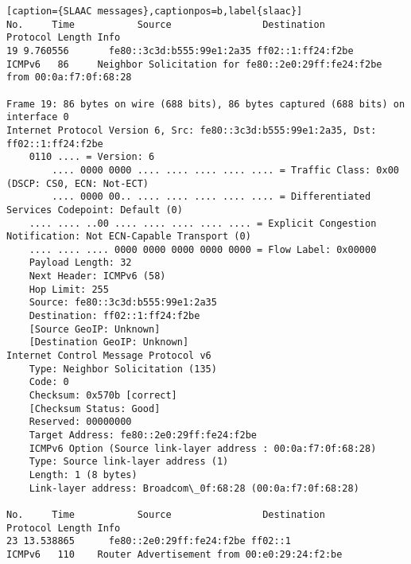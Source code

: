 \begin{lstlisting}[caption={SLAAC messages},captionpos=b,label{slaac}]
No.     Time           Source                Destination           Protocol Length Info
19 9.760556       fe80::3c3d:b555:99e1:2a35 ff02::1:ff24:f2be     ICMPv6   86     Neighbor Solicitation for fe80::2e0:29ff:fe24:f2be from 00:0a:f7:0f:68:28

Frame 19: 86 bytes on wire (688 bits), 86 bytes captured (688 bits) on interface 0
Internet Protocol Version 6, Src: fe80::3c3d:b555:99e1:2a35, Dst: ff02::1:ff24:f2be
	0110 .... = Version: 6
		.... 0000 0000 .... .... .... .... .... = Traffic Class: 0x00 (DSCP: CS0, ECN: Not-ECT)
		.... 0000 00.. .... .... .... .... .... = Differentiated Services Codepoint: Default (0)
	.... .... ..00 .... .... .... .... .... = Explicit Congestion Notification: Not ECN-Capable Transport (0)
	.... .... .... 0000 0000 0000 0000 0000 = Flow Label: 0x00000
	Payload Length: 32
	Next Header: ICMPv6 (58)
	Hop Limit: 255
	Source: fe80::3c3d:b555:99e1:2a35
	Destination: ff02::1:ff24:f2be
	[Source GeoIP: Unknown]
	[Destination GeoIP: Unknown]
Internet Control Message Protocol v6
	Type: Neighbor Solicitation (135)
	Code: 0
	Checksum: 0x570b [correct]
	[Checksum Status: Good]
	Reserved: 00000000
	Target Address: fe80::2e0:29ff:fe24:f2be
	ICMPv6 Option (Source link-layer address : 00:0a:f7:0f:68:28)
	Type: Source link-layer address (1)
	Length: 1 (8 bytes)
	Link-layer address: Broadcom\_0f:68:28 (00:0a:f7:0f:68:28)

No.     Time           Source                Destination           Protocol Length Info
23 13.538865      fe80::2e0:29ff:fe24:f2be ff02::1               ICMPv6   110    Router Advertisement from 00:e0:29:24:f2:be


\end{lstlisting}
